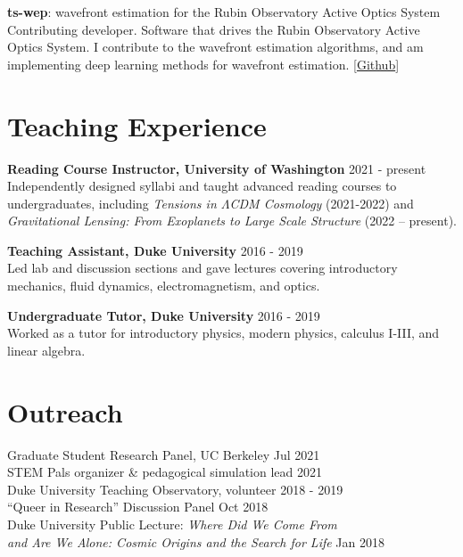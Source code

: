 \documentclass[margin, 11pt]{res}
\begin{document}
\begin{resume}
\hangindent=2mm
\textbf{ts-wep}: wavefront estimation for the Rubin Observatory Active Optics System \\
Contributing developer.
Software that drives the Rubin Observatory Active Optics System.
I contribute to the wavefront estimation algorithms, and am implementing deep learning methods for wavefront estimation.
[\href{https://github.com/lsst-ts/ts_wep}{Github}]


\section{Teaching Experience}

\textbf{Reading Course Instructor, University of Washington} \hfill 2021 - present \\
Independently designed syllabi and taught advanced reading courses to undergraduates, including \textit{Tensions in $\Lambda$CDM Cosmology} (2021-2022) and \textit{Gravitational Lensing: From Exoplanets to Large Scale Structure} (2022 -- present).

\textbf{Teaching Assistant, Duke University} \hfill 2016 - 2019 \\
Led lab and discussion sections and gave lectures covering introductory mechanics, fluid dynamics, electromagnetism, and optics.

\textbf{Undergraduate Tutor, Duke University} \hfill 2016 - 2019 \\
Worked as a tutor for introductory physics, modern physics, calculus I-III, and linear algebra.

\section{Outreach}

Graduate Student Research Panel, UC Berkeley \hfill Jul 2021 \\
STEM Pals organizer \& pedagogical simulation lead  \hfill 2021 \\
Duke University Teaching Observatory, volunteer \hfill 2018 - 2019 \\
``Queer in Research'' Discussion Panel \hfill Oct 2018 \\
Duke University Public Lecture: \textit{Where Did We Come From} \\
\hspace*{4mm} \textit{and Are We Alone: Cosmic Origins and the Search for Life} \hfill Jan 2018


\end{resume}
\end{document}
